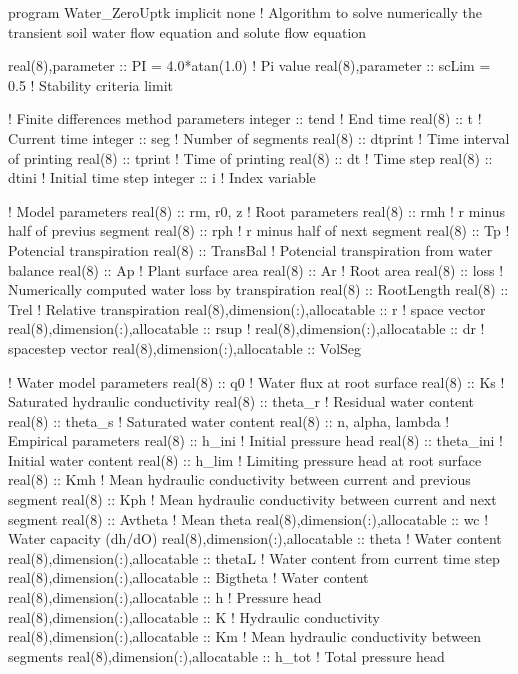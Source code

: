 \begtt

program Water_ZeroUptk
implicit none
! Algorithm to solve numerically the transient soil water flow equation and solute flow equation

real(8),parameter :: PI = 4.0*atan(1.0)		! Pi value
real(8),parameter :: scLim = 0.5		! Stability criteria limit

! Finite differences method parameters
integer :: tend				  	! End time
real(8) :: t				  	! Current time
integer :: seg 				  	! Number of segments
real(8) :: dtprint			  	! Time interval of printing
real(8) :: tprint				! Time of printing
real(8) :: dt				  	! Time step
real(8) :: dtini				! Initial time step
integer :: i				  	! Index variable

! Model parameters
real(8) :: rm, r0, z 				! Root parameters
real(8) :: rmh					! r minus half of previus segment
real(8) :: rph					! r minus half of next segment
real(8) :: Tp					! Potencial transpiration
real(8) :: TransBal				! Potencial transpiration from water balance
real(8) :: Ap					! Plant surface area
real(8) :: Ar					! Root area
real(8) :: loss					! Numerically computed water loss by transpiration
real(8) :: RootLength
real(8) :: Trel					! Relative transpiration
real(8),dimension(:),allocatable :: r     	! space vector
real(8),dimension(:),allocatable :: rsup     	!
real(8),dimension(:),allocatable :: dr     	! spacestep vector
real(8),dimension(:),allocatable :: VolSeg     	

! Water model parameters
real(8) :: q0					! Water flux at root surface
real(8) :: Ks				  	! Saturated hydraulic conductivity
real(8) :: theta_r				! Residual water content
real(8) :: theta_s				! Saturated water content
real(8) :: n, alpha, lambda			! Empirical parameters
real(8) :: h_ini				! Initial pressure head
real(8) :: theta_ini				! Initial water content
real(8) :: h_lim				! Limiting pressure head at root surface
real(8) :: Kmh					! Mean hydraulic conductivity between current and previous segment
real(8) :: Kph					! Mean hydraulic conductivity between current and next segment
real(8) :: Avtheta				! Mean theta
real(8),dimension(:),allocatable :: wc    	! Water capacity (dh/dO)
real(8),dimension(:),allocatable :: theta	! Water content 
real(8),dimension(:),allocatable :: thetaL	! Water content from current time step
real(8),dimension(:),allocatable :: Bigtheta	! Water content 
real(8),dimension(:),allocatable :: h		! Pressure head
real(8),dimension(:),allocatable :: K		! Hydraulic conductivity
real(8),dimension(:),allocatable :: Km		! Mean hydraulic conductivity between segments
real(8),dimension(:),allocatable :: h_tot	! Total pressure head

